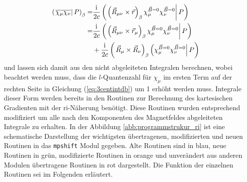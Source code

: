 	\begin{equation}\label{eq:3centintdb}
	\begin{aligned}
	\left(\left.\overline{\chi_\mu\chi_\nu}\right\vert P\right)_\beta=&\frac{\mathrm{i}\mkern1mu}{2c}\left(\left.\left(\vec{R}_{\mu\nu}\times\vec{r}\right)_\beta\chi_\mu^{\vec{B}=0}\chi_\nu^{\vec{B}=0}\right\vert P\right)\\
	=&\frac{\mathrm{i}\mkern1mu}{2c}\left(\left.\left(\vec{R}_{\mu\nu}\times\vec{r}_\mu\right)_\beta\chi_\mu^{\vec{B}=0}\chi_\nu^{\vec{B}=0}\right\vert P\right)\\
	&+\frac{\mathrm{i}\mkern1mu}{2c}\left(\left.\vec{R}_\mu\times\vec{R}_\nu\right)_\beta\left(\chi_\mu^{\vec{B}=0}\chi_\nu^{\vec{B}=0}\right\vert P\right)
	\end{aligned}
	\end{equation}
	und lassen sich damit aus den nicht abgeleiteten Integralen berechnen, wobei beachtet werden muss, dass die $l$-Quantenzahl für $\chi_\mu$ im ersten Term auf der rechten Seite in Gleichung (\ref{eq:3centintdb}) um 1 erhöht werden muss. Integrale dieser Form werden bereits in den Routinen zur Berechnung des kartesischen Gradienten mit der \ac{ri}-Näherung benötigt. Diese Routinen wurden entsprechend modifiziert um alle nach den Komponenten des Magnetfeldes abgeleiteten Integrale zu erhalten. In der Abbildung \ref{abb:programmstrukur_ri} ist eine schematische Darstellung der wichtigsten übertragenen, modifizierten und neuen Routinen in das \texttt{mpshift} Modul gegeben. Alte Routinen sind in blau, neue Routinen in grün, modifizierte Routinen in orange und unverändert aus anderen Modulen übertragene Routinen in rot dargestellt. Die Funktion der einzelnen Routinen sei im Folgenden erläutert.
	
